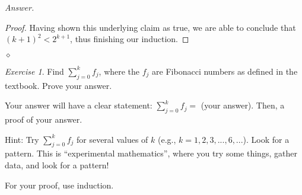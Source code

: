 \documentclass[12pt,oneside]{amsart}
\theoremstyle{remark}
\newtheorem{exer}{Exercise}
\newenvironment{answer}{\bigskip\noindent\emph{Answer.}}{\hfill$\diamond$\newline}
\begin{document}
\begin{answer}
\begin{proof}
Having shown this underlying claim as true, we are able to conclude that $(k + 1)^2 < 2^{k + 1}$, thus finishing our induction. %
\end{proof}

\end{answer}

%
%
%
%

\newpage
\begin{exer}
Find $\sum_{j = 0}^k f_j$, where the $f_j$ are Fibonacci numbers as defined in the textbook. Prove your answer.

Your answer will have a clear statement: $\sum_{j = 0}^k f_j =$ (your answer). Then, a proof of your answer.

Hint: Try $\sum_{j = 0}^k f_j$ for several values of $k$ (e.g., $k = 1, 2, 3, ..., 6, ...$). Look for a pattern. This is “experimental mathematics”, where you try some things, gather data, and look for a pattern!

For your proof, use induction.
\end{exer}
\end{document}
